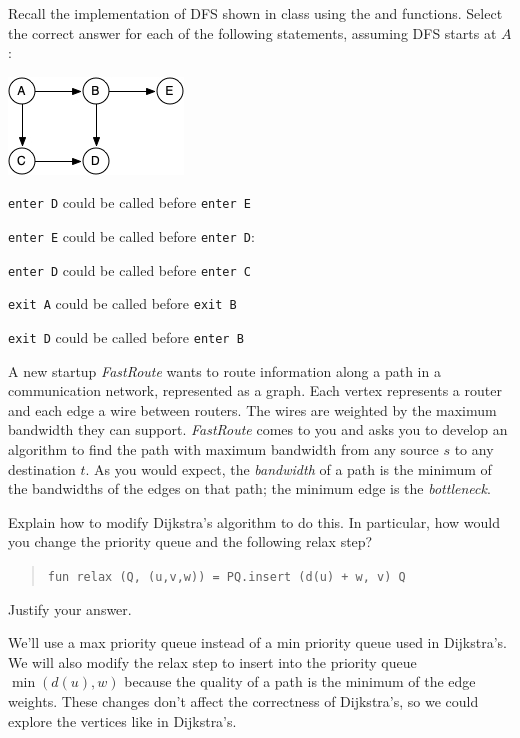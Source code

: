 %
\begin{problem}

Recall the implementation of DFS shown in class using the 
and  functions. Select the correct answer for each of the
following statements, assuming DFS starts at $A$:

\begin{center}
  \includegraphics[scale=.7]{media/dfs-graph1.jpg}
\end{center}

\asktf
\texttt{enter D} could be called before \texttt{enter E}

\solt


\asktf
\texttt{enter E} could be called before \texttt{enter D}:
\solt

\asktf
\texttt{enter D} could be called before \texttt{enter C}
\solt

\asktf 
\texttt{exit A} could be called before \texttt{exit B}
\solf

\asktf
\texttt{exit D} could be called before \texttt{enter B}
\solt

\end{problem}

%

\begin{problem}[5.]

A new startup \emph{FastRoute} wants to route information along a path
in a communication network, represented as a graph. Each vertex
represents a router and each edge a wire between routers. The wires
are weighted by the maximum bandwidth they can
support. \emph{FastRoute} comes to you and asks you to develop an
algorithm to find the path with maximum bandwidth from any source $s$
to any destination $t$. As you would expect, the \emph{bandwidth} of a
path is the minimum of the bandwidths of the edges on that path; the
minimum edge is the \emph{bottleneck}.

\ask
Explain how to modify Dijkstra's algorithm to do this. In particular, how would
you change the priority queue and the following relax step?

\begin{quote}
\texttt{fun relax (Q, (u,v,w)) = PQ.insert (d(u) + w, v) Q}
\end{quote}

Justify your answer.

\sol
  We'll use a max priority queue instead of a min priority queue used
  in Dijkstra's. We will also modify the relax step to insert into the
  priority queue $\min(d(u), w)$ because the quality of a path is the
  minimum of the edge weights. These changes don't affect the
  correctness of Dijkstra's, so we could explore the vertices like in
  Dijkstra's.
\end{problem}


